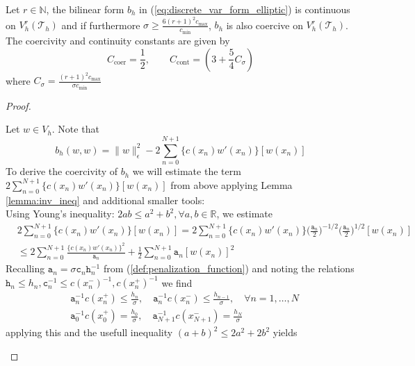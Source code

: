 \begin{theorem}
	\label{thr:cont_coerc_bilin_form}
	Let $r\in \mathbb{N}$, the bilinear form $b_h$ in (\ref{eq:discrete_var_form_elliptic}) is continuous
	on $V_h^r(\mathcal{T}_h)$ and if furthermore $\sigma \geq \frac{6 (r+1)^2 c_{\max} }{c_{\min}}$, $b_h$ is also
	coercive on $V_h^r(\mathcal{T}_h)$. 
	The coercivity and continuity constants are given by 
	\begin{equation*}
		C_{\text{coer}} = \frac{1}{2}, \qquad C_{\text{cont}} = (3 + \frac{5}{4} C_{\sigma}) 
	\end{equation*}
	where $C_{\sigma} = \frac{(r+1)^2 c_{\max} }{\sigma c_{\min}}$
\end{theorem}
\begin{proof}
	\begin{proofstep}[Coercivity]
		Let $w\in V_h$. Note that
		\begin{equation}
			\label{eq:coerc_thr_relation_bilin_form_with_norm}
			b_h(w,w) = \|w\|_{\epsilon}^2 - 2\sum_{n=0}^{N+1}\{c(x_n)w'(x_n)\}[w(x_n)]
		\end{equation}
		To derive the coercivity of $b_h$ we will estimate the term $2\sum_{n=0}^{N+1}\{c(x_n)w'(x_n)\}[w(x_n)]$
		from above applying Lemma \ref{lemma:inv_ineq} and additional smaller tools:\\
		Using Young's inequality: $2ab \leq a^2 + b^2, \forall a,b\in\mathbb{R}$, we estimate
		\begin{align}
			 & 2\sum_{n=0}^{N+1}\{c(x_n)w'(x_n)\}[w(x_n)] = 2\sum_{n=0}^{N+1}\{c(x_n)w'(x_n)\}
			\Big(\frac{\texttt{a}_n}{2}\Big)^{-1/2} \Big(\frac{\texttt{a}_n}{2}\Big)^{1/2} [w(x_n)]\nonumber \\
			 & \leq 2\sum_{n=0}^{N+1} \frac{\{c(x_n)w'(x_n)\}^2}{\texttt{a}_n}
			+ \frac{1}{2} \sum_{n=0}^{N+1} \texttt{a}_n [w(x_n)]^2 \label{eq:2_coerc_thr_first_estimate}
		\end{align}
		Recalling $\texttt{a}_n = \sigma \texttt{c}_n\texttt{h}_n^{-1}$ from (\ref{def:penalization_function}) and noting the relations
		$\texttt{h}_n \leq h_n, \texttt{c}_n^{-1} \leq c(x_n^-)^{-1}, c(x_n^+)^{-1}$ we find
		\begin{align*}
			 & \texttt{a}_n^{-1} c(x_n^+) \leq \frac{h_n}{\sigma}, \quad \texttt{a}_n^{-1} c(x_n^-) \leq \frac{h_{n-1}}{\sigma}, \quad \forall n=1,\ldots,N \\
			 & \texttt{a}_0^{-1} c(x_0^+) = \frac{h_0}{\sigma} , \quad \texttt{a}_{N+1}^{-1} c(x_{N+1}^-) = \frac{h_{N}}{\sigma}
		\end{align*}
		applying this and the usefull inequality $(a+b)^2 \leq 2a^2 + 2b^2$ yields

\end{proofstep}
\end{proof}

